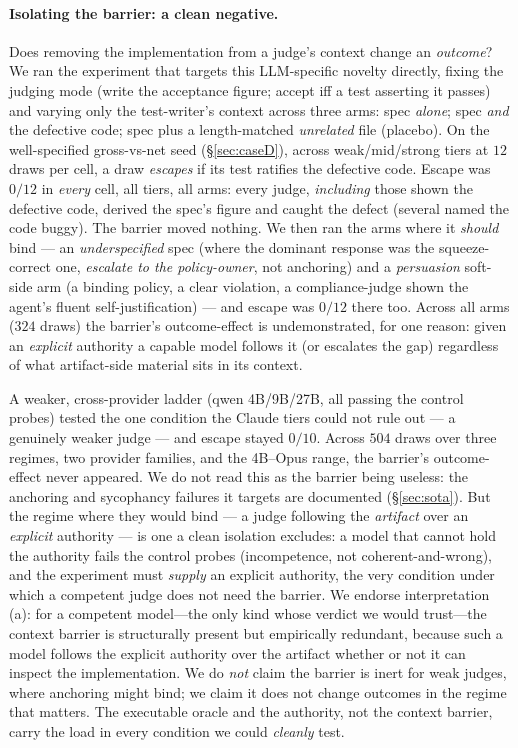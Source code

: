 \documentclass[11pt]{article}
\begin{document}
\paragraph{Isolating the barrier: a clean negative.} Does removing the implementation from a judge's
context change an \emph{outcome}? We ran the experiment that targets this LLM-specific novelty directly,
fixing the judging mode (write the acceptance figure; accept iff a test asserting it passes) and varying
only the test-writer's context across three arms: spec \emph{alone}; spec \emph{and} the defective code;
spec plus a length-matched \emph{unrelated} file (placebo). On the well-specified gross-vs-net seed
(\S\ref{sec:caseD}), across weak/mid/strong tiers at $12$ draws per cell, a draw \emph{escapes} if its
test ratifies the defective code. Escape was $0/12$ in \emph{every} cell, all tiers, all arms: every
judge, \emph{including} those shown the defective code, derived the spec's figure and caught the defect
(several named the code buggy). The barrier moved nothing. We then ran the arms where it \emph{should}
bind --- an \emph{underspecified} spec (where the dominant response was the squeeze-correct one,
\emph{escalate to the policy-owner}, not anchoring) and a \emph{persuasion} soft-side arm (a binding
policy, a clear violation, a compliance-judge shown the agent's fluent self-justification) --- and escape
was $0/12$ there too. Across all arms ($324$ draws) the barrier's outcome-effect is undemonstrated, for
one reason: given an \emph{explicit} authority a capable model follows it (or escalates the gap)
regardless of what artifact-side material sits in its context.

A weaker, cross-provider ladder (qwen 4B/9B/27B, all passing the control probes) tested the one condition
the Claude tiers could not rule out --- a genuinely weaker judge --- and escape stayed $0/10$. Across
$504$ draws over three regimes, two provider families, and the 4B--Opus range, the barrier's
outcome-effect never appeared. We do not read this as the barrier being useless: the anchoring and
sycophancy failures it targets are documented (\S\ref{sec:sota}). But the regime where they would bind
--- a judge following the \emph{artifact} over an \emph{explicit} authority --- is one a clean isolation
excludes: a model that cannot hold the authority fails the control probes (incompetence, not
coherent-and-wrong), and the experiment must \emph{supply} an explicit authority, the very condition
under which a competent judge does not need the barrier. We endorse interpretation (a): for a competent
model---the only kind whose verdict we would trust---the context barrier is structurally present but
empirically redundant, because such a model follows the explicit authority over the artifact whether or
not it can inspect the implementation. We do \emph{not} claim the barrier is inert for weak judges, where
anchoring might bind; we claim it does not change outcomes in the regime that matters. The executable
oracle and the authority, not the context barrier, carry the load in every condition we could
\emph{cleanly} test.
\end{document}
